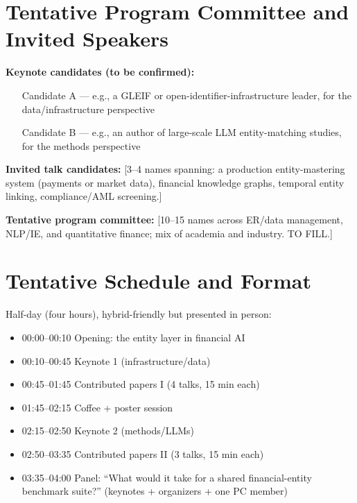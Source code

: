 \documentclass[12pt]{article}
\begin{document}
\section{Tentative Program Committee and Invited Speakers}


\textbf{Keynote candidates (to be confirmed):}
\begin{itemize}
  \item [Candidate A — e.g., a GLEIF or open-identifier-infrastructure
        leader, for the data/infrastructure perspective]
  \item [Candidate B — e.g., an author of large-scale LLM
        entity-matching studies, for the methods perspective]
\end{itemize}

\textbf{Invited talk candidates:} [3--4 names spanning: a production
entity-mastering system (payments or market data), financial
knowledge graphs, temporal entity linking, compliance/AML screening.]

\textbf{Tentative program committee:} [10--15 names across ER/data
management, NLP/IE, and quantitative finance; mix of academia and
industry. TO FILL.]

\section{Tentative Schedule and Format}

Half-day (four hours), hybrid-friendly but presented in person:

\begin{itemize}
  \item 00:00--00:10 \quad Opening: the entity layer in financial AI
  \item 00:10--00:45 \quad Keynote 1 (infrastructure/data)
  \item 00:45--01:45 \quad Contributed papers I (4 talks, 15 min each)
  \item 01:45--02:15 \quad Coffee + poster session
  \item 02:15--02:50 \quad Keynote 2 (methods/LLMs)
  \item 02:50--03:35 \quad Contributed papers II (3 talks, 15 min each)
  \item 03:35--04:00 \quad Panel: ``What would it take for a shared
        financial-entity benchmark suite?'' (keynotes + organizers +
        one PC member)
\end{itemize}
\end{document}
